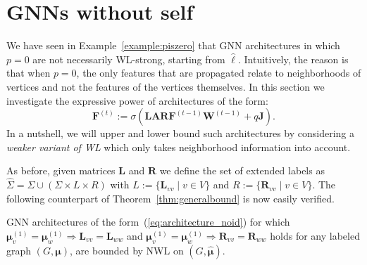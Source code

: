 \section{GNNs without self}

We have seen in Example~\ref{example:piszero} that GNN architectures in which $p=0$ are not necessarily WL-strong, starting from $\hat{\pmb{\ell}}$. Intuitively, the reason is that when $p=0$, the only features that are propagated relate to neighborhoods of vertices and not the features of the vertices themselves. In this section we investigate the expressive power of architectures of the form:
\begin{equation}
\mathbf{F}^{(t)}:=\sigma\left(\mathbf{L}\mathbf{A}\mathbf{R}\mathbf{F}^{(t-1)}\mathbf{W}^{(t-1)} + q\mathbf{J}\right). \label{eq:architecture_noid}
\end{equation}
In a nutshell, we will upper and lower bound such architectures by 
 considering a \textit{weaker variant of WL}  which only takes neighborhood information into account.



As before, given matrices $\mathbf{L}$ and $\mathbf{R}$ we define the set of 
extended labels as $\hat{\Sigma}=\Sigma\cup (\Sigma\times L\times R)$ with
$L:=\{\mathbf{L}_{vv}\mid v\in V\}$ and $R:=\{\mathbf{R}_{vv}\mid v\in V\}$.
The following counterpart of Theorem~\ref{thm:generalbound} is now easily verified.

\begin{theorem}\label{thm:generalbound_noid}
GNN architectures of the form~(\ref{eq:architecture_noid}) for which 
	$\pmb{\mu}^{(1)}_v=\pmb{\mu}^{(1)}_w\Rightarrow  \mathbf{L}_{vv}=\mathbf{L}_{ww}$ and
$\pmb{\mu}^{(1)}_v=\pmb{\mu}^{(1)}_w\Rightarrow  \mathbf{R}_{vv}=\mathbf{R}_{ww}$  holds for any labeled graph  $(G,\pmb{\mu})$, are bounded by NWL on $(G,\hat{\pmb{\mu}})$.
\end{theorem}

